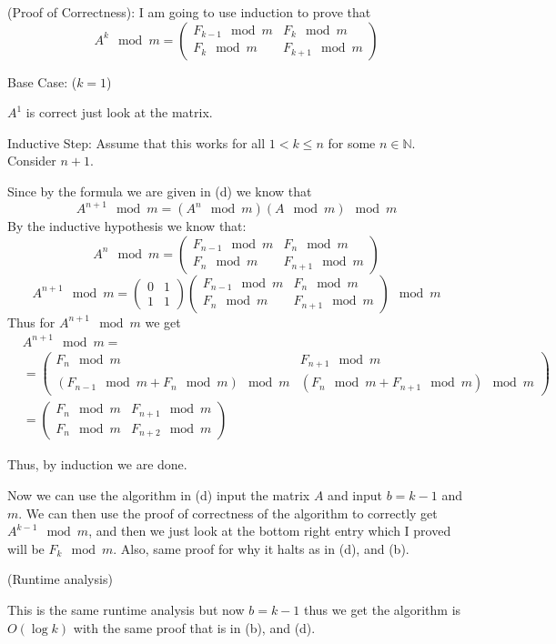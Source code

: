 \documentclass[12pt, letterpaper]{article}
\theoremstyle{definition}
\newcommand{\N}{\mathbb{N}}
\begin{document}
\begin{enumerate}[(a)]
    (Proof of Correctness): I am going to use induction to prove that
    \[A^k \mod m = \begin{pmatrix}
        F_{k-1} \mod m & F_k \mod m\\
        F_k \mod m & F_{k+1} \mod m
    \end{pmatrix}\]

    Base Case: ($k=1$)

    $A^1$ is correct just look at the matrix.

    Inductive Step: Assume that this works for all $1<k \leq n$ for some $n \in \N$. Consider $n+1$.

    Since by the formula we are given in (d) we know that
    \[A^{n+1} \mod m = (A^{n} \mod m)(A \mod m) \mod m\]
    By the inductive hypothesis we know that:
    \[A^{n} \mod m = \begin{pmatrix}
        F_{n-1} \mod m & F_n \mod m\\
        F_{n} \mod m & F_{n+1} \mod m
    \end{pmatrix}\]
    \[A^{n+1} \mod m = \begin{pmatrix}
        0 & 1\\
        1 & 1
    \end{pmatrix} \begin{pmatrix}
        F_{n-1} \mod m & F_n \mod m\\
        F_{n} \mod m & F_{n+1} \mod m
    \end{pmatrix}\mod m\]
    Thus for $A^{n+1} \mod m$ we get
    \begin{align*}
        &A^{n+1} \mod m=\\
        &=\begin{pmatrix}
            F_n \mod m & F_{n+1} \mod m\\
            (F_{n-1} \mod m + F_{n} \mod m) \mod m & (F_{n} \mod m + F_{n+1} \mod m)\mod m
        \end{pmatrix}\\
        &=\begin{pmatrix}
            F_n \mod m & F_{n+1} \mod m\\
            F_{n} \mod m & F_{n+2} \mod m
        \end{pmatrix}
    \end{align*}

    Thus, by induction we are done.

    Now we can use the algorithm in (d) input the matrix $A$ and input $b=k-1$ and $m$.
    We can then use the proof of correctness of the algorithm to correctly get $A^{k-1} \mod m$, and then we just look at the bottom right entry which I proved will be $F_k \mod m$. Also, same proof for why it halts as in (d), and (b).

    (Runtime analysis)

    This is the same runtime analysis but now $b=k-1$ thus we get the algorithm is $O(\log k)$ with the same proof that is in (b), and (d).
\end{enumerate}
\end{document}
